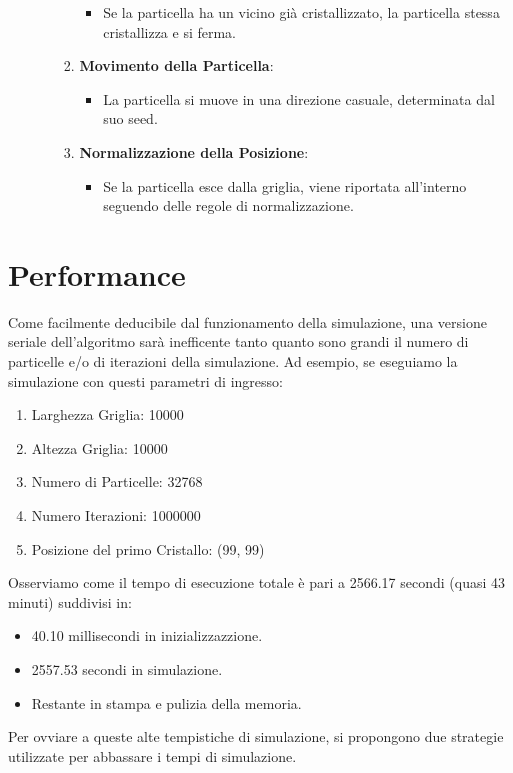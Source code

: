 \documentclass{article}
\begin{document}
\begin{enumerate}
\begin{itemize}
\begin{enumerate}
\begin{itemize}
                        \item Se la particella ha un vicino già cristallizzato, la particella stessa cristallizza e si ferma.
                    \end{itemize}
                \item \textbf{Movimento della Particella}:
                    \begin{itemize}
                        \item La particella si muove in una direzione casuale, determinata dal suo seed.
                    \end{itemize}
                \item \textbf{Normalizzazione della Posizione}:
                    \begin{itemize}
                        \item Se la particella esce dalla griglia, viene riportata all'interno seguendo delle regole di normalizzazione.
                    \end{itemize}
            \end{enumerate}
    \end{itemize}
\end{enumerate}

\section{Performance}
Come facilmente deducibile dal funzionamento della simulazione, una versione seriale dell'algoritmo sarà inefficente tanto quanto sono grandi il numero di particelle e/o di iterazioni della simulazione.
Ad esempio, se eseguiamo la simulazione con questi parametri di ingresso:
\begin{enumerate}
    \item Larghezza Griglia: 10000
    \item Altezza Griglia: 10000
    \item Numero di Particelle: 32768
    \item Numero Iterazioni: 1000000
    \item Posizione del primo Cristallo: (99, 99) 
\end{enumerate}
Osserviamo come il tempo di esecuzione totale è pari a 2566.17 secondi (quasi 43 minuti) suddivisi in:
\begin{itemize}
    \item 40.10 millisecondi in inizializzazzione.
    \item 2557.53 secondi in simulazione.
    \item Restante in stampa e pulizia della memoria.
\end{itemize}
Per ovviare a queste alte tempistiche di simulazione, si propongono due strategie utilizzate per abbassare i tempi di simulazione.
\end{document}
